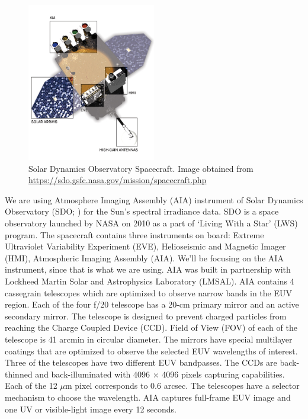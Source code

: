 \begin{figure}[ht]
    \centering
    \includegraphics[width=0.5\textwidth]{images/spacecraft_detailed.jpg}
    \caption[SDO Spacecraft]{Solar Dynamics Observatory Spacecraft.
      Image obtained from {\url{https://sdo.gsfc.nasa.gov/mission/spacecraft.php}}}
    \label{fig:label}
\end{figure}

We are using Atmosphere Imaging Assembly (AIA) instrument of Solar Dynamics Observatory (SDO; \citep{Pesnell2011}) for the Sun's spectral irradiance data. SDO is a space observatory launched by NASA on 2010 as a part of `Living With a Star' (LWS) program. The spacecraft contains three instruments on board: Extreme Ultraviolet Variability Experiment (EVE), Helioseismic and Magnetic Imager (HMI), Atmospheric Imaging Assembly (AIA). We'll be focusing on the AIA instrument, since that is what we are using. AIA was built in partnership with Lockheed Martin Solar and Astrophysics Laboratory (LMSAL). AIA contains 4 cassegrain telescopes which are optimized to observe narrow bands in the EUV region. Each of the four f/20 telescope has a 20-cm primary mirror and an active secondary mirror. The telescope is designed to prevent charged particles from reaching the Charge Coupled Device (CCD). Field of View (FOV) of each of the telescope is 41 arcmin in circular diameter. The mirrors have special multilayer coatings that are optimized to observe the selected EUV wavelengths of interest. Three of the telescopes have two different EUV bandpasses. The CCDs are back-thinned and back-illuminated with 4096 $\times$ 4096 pixels capturing capabilities. Each of the 12 $\mu$m pixel corresponds to 0.6 arcsec. The telescopes have a selector mechanism to choose the wavelength. AIA captures full-frame EUV image and one UV or visible-light image every 12 seconds. \citep{Lemen2011}\\

